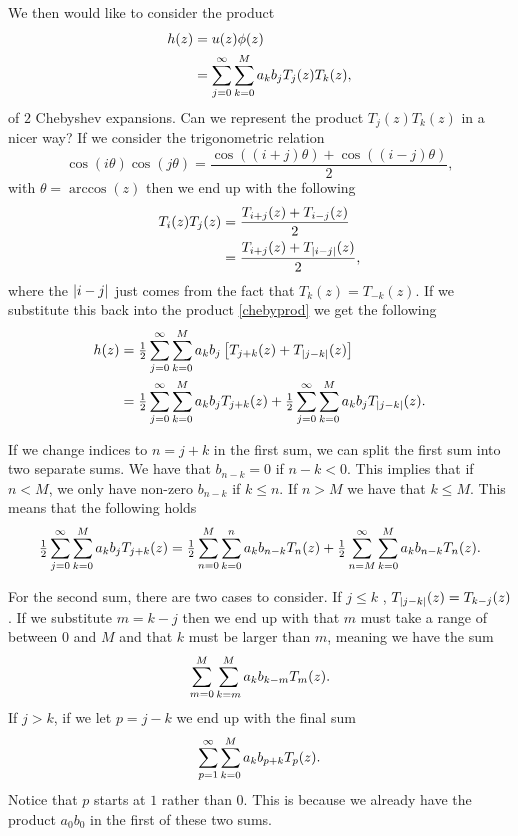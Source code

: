 We then would like to consider the product 
\begin{align}
    h(z) &= u(z) \phi(z) \\
    &= \sum^\infty_{j=0} \sum^M_{k=0} a_k b_j T_j(z) T_k(z),
    \label{chebyprod}
\end{align}
of $ 2 $ Chebyshev expansions. Can we represent the product $ T_j(z) T_k(z) $ in a nicer way? If we consider the trigonometric relation
\begin{equation}
    \cos(i \theta) \cos(j \theta) = \frac{\cos((i + j)\theta) + \cos((i - j) \theta) }{2},
\end{equation}
with $ \theta = \arccos(z)$ then we end up with the following
\begin{align}
    T_i(z) T_j(z) &= \frac{T_{i+j}(z) + T_{i-j}(z) }{2} \\
    &= \frac{T_{i+j}(z) + T_{\abs{i-j}}(z)}{2},
\end{align}
where the $ \abs{i-j}$ just comes from the fact that $ T_k(z) = T_{-k}(z) $. If we substitute this back into the product \eqref{chebyprod} we get the following
\begin{align}
    h(z) &=  \tfrac{1}{2} \sum^\infty_{j=0} \sum^M_{k = 0} a_k b_j \left[T_{j + k}(z) + T_{\abs{j - k}}(z)\right] \\
    &= \tfrac{1}{2} \sum^\infty_{j=0} \sum^M_{k = 0} a_k b_j T_{j + k}(z) + \tfrac{1}{2} \sum^\infty_{j=0} \sum^M_{k = 0} a_k b_j T_{\abs{j - k}}(z).
    \label{hz}
\end{align}

If we change indices to $ n = j + k$ in the first sum, we can split the first sum into two separate sums. We have that $ b_{n - k} = 0 $ if $ n - k < 0$. This implies that if $ n < M$, we only have non-zero $ b_{n - k}$ if $ k \leq n $. If $ n > M$ we have that $ k \leq M $. This means that the following holds
\begin{equation}
    \tfrac{1}{2} \sum^\infty_{j=0} \sum^M_{k = 0} a_k b_j T_{j + k}(z) = \tfrac{1}{2} \sum^{M}_{n=0} \sum^n_{k=0} a_k b_{n - k} T_{n}(z) + \tfrac{1}{2} \sum^\infty_{n=M} \sum^M_{k=0} a_k b_{n -k} T_{n}(z).
\end{equation}

For the second sum, there are two cases to consider. If $ j \leq k$ , $ T_{\abs{j - k }}(z) = T_{k - j}(z)$. If we substitute $ m = k - j $ then we end up with that $ m $ must take a range of between $ 0 $ and $ M$ and that $ k $ must be larger than $ m$, meaning we have the sum 
\begin{equation}
    \sum^M_{m=0} \sum^M_{k=m} a_k b_{k - m} T_{m}(z).
\end{equation}
If $ j > k $, if we let $ p = j - k$ we end up with the final sum 
\begin{equation}
    \sum^\infty_{p=1} \sum^M_{k=0} a_k b_{p+k} T_{p}(z).
\end{equation}
Notice that $ p $ starts at $ 1 $ rather than $ 0$. This is because we already have the product $ a_0 b_0 $ in the first of these two sums.

